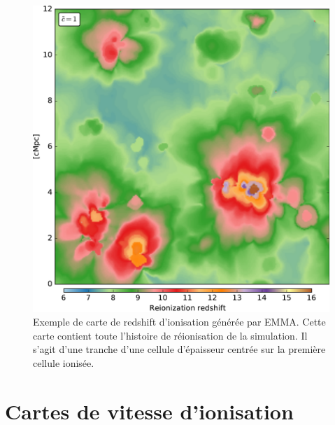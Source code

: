 \begin{figure}
        \includegraphics[width=.95\linewidth]{img/04_mapreio/map_z_c1.pdf} 
        \caption[Carte de redshift d'ionisation]{Exemple de carte de redshift d'ionisation générée par EMMA.
        Cette carte contient toute l'histoire de réionisation de la simulation.
        Il s'agit d'une tranche d'une cellule d'épaisseur centrée sur la première cellule ionisée.
 		\label{fig:zmap}}
\end{figure}

\clearpage
\section{Cartes de vitesse d’ionisation}
\label{sec:vreio}

